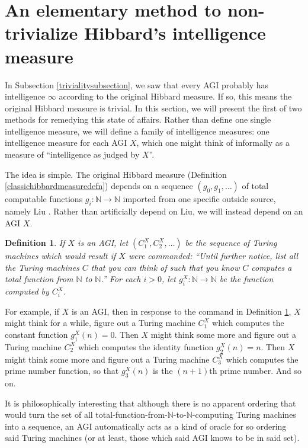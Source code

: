 \documentclass{article}
\newtheorem{definition}[theorem]{Definition}
\begin{document}
\section{An elementary method to non-trivialize Hibbard's intelligence measure}
\label{simplemeasuresection}

In Subsection \ref{trivialitysubsection}, we saw that every AGI probably has
intelligence $\infty$ according to the original Hibbard measure. If so, this
means the original Hibbard measure is trivial. In this section, we will present
the first of two methods for remedying this state of affairs. Rather than define
one single intelligence measure, we will define a family of intelligence measures:
one intelligence measure for each AGI $X$, which one might think of informally as
a measure of ``intelligence as judged by $X$''.

The idea is simple. The original Hibbard measure
(Definition \ref{classichibbardmeasuredefn}) depends on a sequence $(g_0,g_1,\ldots)$
of total computable functions $g_i:\mathbb N\to\mathbb N$ imported from one specific
outside source, namely Liu \cite{liu1960enumeration}. Rather than artificially depend
on Liu, we will instead depend on an AGI $X$.

\begin{definition}
\label{functionlistdefinition}
    If $X$ is an AGI, let $(C^X_1, C^X_2, \ldots)$ be the sequence of
    Turing machines which would result if $X$ were commanded: ``Until further
    notice, list all the Turing machines $C$ that you can think of such that
    you know $C$ computes a total function from $\mathbb N$ to $\mathbb N$.''
    For each $i>0$, let $g^X_i:\mathbb N\to\mathbb N$ be the function computed by
    $C^X_i$.
\end{definition}

For example, if $X$ is an AGI, then in response to the command in Definition
\ref{functionlistdefinition}, $X$ might think for a while, figure out a Turing
machine $C^X_1$ which computes the constant function $g^X_1(n)=0$. Then $X$
might think some more and figure out a Turing machine $C^X_2$ which computes
the identity function $g^X_2(n)=n$. Then $X$ might think some more and figure
out a Turing machine $C^X_3$ which computes the prime number function, so that
$g^X_3(n)$ is the $(n+1)$th prime number. And so on.

It is philosophically interesting that although there is no apparent ordering that
would turn the set of all total-function-from-$\mathbb N$-to-$\mathbb N$-computing
Turing machines into a sequence, an AGI automatically acts as a kind of oracle for
so ordering said Turing machines (or at least, those which said AGI knows to be in
said set).
\end{document}
